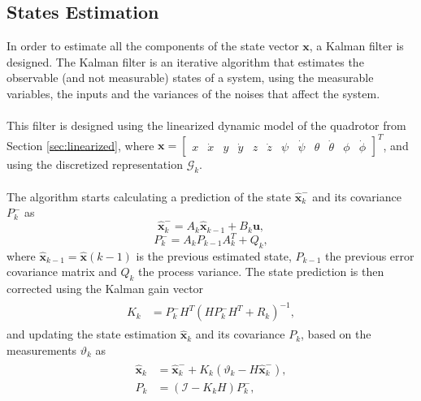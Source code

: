\subsection{States Estimation}
In order to estimate all the components of the state vector $\mathbf{x}$, a Kalman filter is designed. The Kalman filter is an iterative algorithm that estimates the observable (and not measurable) states of a system, using the measurable variables, the inputs and the variances of the noises that affect the system.
\\\\
This filter is designed using the linearized dynamic model of the quadrotor from Section \ref{sec:linearized}, where $\mathbf{x} =  \begin{bmatrix}
x & \dot{x} & y & \dot{y} & z & \dot{z} & \psi & \dot{\psi} & \theta & \dot{\theta} & \phi & \dot{\phi}
\end{bmatrix}^{T}$, and using the discretized representation $\mathcal{G}_k$.
\\\\
The algorithm starts calculating a prediction of the state $\hat{\mathbf{x}}_{k}^{-}$ and its covariance $P_{k}^{-}$ as
\begin{equation}\label{eqn:statePrognosis}
\hat{\mathbf{x}}_{k}^{-} = A_k\hat{\mathbf{x}}_{k-1}+B_k\mathbf{u},
\end{equation}
\begin{equation}\label{eqn:covariancePrognosis}
P_{k}^{-} = A_k P_{k-1} A_{k}^{T} + Q_{k},
\end{equation}
where $\hat{\mathbf{x}}_{k-1} = \hat{\mathbf{x}}(k-1)$ is the previous estimated state, $P_{k-1}$ the previous error covariance matrix and $Q_{k}$ the process variance. The state prediction is then corrected using the Kalman gain vector
\begin{align}\label{eqn:correctionKalman}
\begin{split}
K_{k} &= P^{-}_{k}H^{T}(HP^{-}_{k}H^{T} + R_k)^{-1},
\end{split}
\end{align}
and updating the state estimation $\hat{\mathbf{x}}_{k}$ and its covariance $P_{k}$, based on the measurements $\vartheta_k$ as
\begin{align}\label{eqn:correctionKalman2}
\begin{split}
\hat{\mathbf{x}}_{k} &= \hat{\mathbf{x}}^{-}_{k} + K_{k}(\vartheta_{k} - H\hat{\mathbf{x}}^{-}_{k}),\\
P_{k} &= (\mathcal{I} - K_{k}H)P^{-}_{k},
\end{split}
\end{align}
